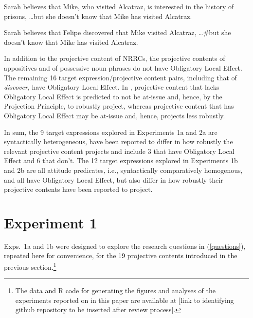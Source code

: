 \documentclass[11pt,fleqn]{article}
\newcommand{\6}{\mbox{$[\hspace*{-.6mm}[$}}
\newcommand{\9}{\mbox{$]\hspace*{-.6mm}]$}}
\begin{document}
\begin{exe}
\ex\label{ole}
\begin{xlist}
\ex Sarah believes that Mike, who visited Alcatraz, is interested in the history of prisons, \ldots but she doesn't know that Mike has visited Alcatraz.

\ex Sarah believes that Felipe discovered that Mike visited Alcatraz, \ldots \#but she doesn't know that Mike has visited Alcatraz. 

\end{xlist}
\end{exe}
In addition to the projective content of NRRCs, the projective contents of appositives and of possessive noun phrases do not have Obligatory Local Effect. The remaining 16 target expression/projective content pairs, including that of {\em discover}, have Obligatory Local Effect. In \citealt[281]{brst-ar}, projective content that lacks Obligatory Local Effect is predicted to not be at-issue and, hence, by the Projection Principle, to robustly project, whereas projective content that has Obligatory Local Effect may be at-issue and, hence, projects less robustly.

In sum, the 9 target expressions explored in Experiments 1a and 2a are syntactically heterogeneous, have been reported to differ in how robustly the relevant projective content projects and include 3 that have Obligatory Local Effect and 6 that don't. The 12 target expressions explored in Experiments 1b and 2b are all attitude predicates, i.e., syntactically comparatively homogenous, and all have Obligatory Local Effect, but also differ in how robustly their projective contents have been reported to project.


\section{Experiment 1}
\label{s3}

Exps.~1a and 1b were designed to explore the research questions in (\ref{questions}), repeated here for convenience, for the 19 projective contents introduced in the previous section.\footnote{The
data and R code for generating the figures and analyses
of the experiments reported on in this paper are available at $[$link to identifying github repository to be inserted after review process$]$.}
\end{document}
